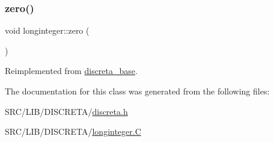 \subsubsection{\texorpdfstring{zero()}{zero()}}
{\footnotesize\ttfamily void longinteger\+::zero (\begin{DoxyParamCaption}{ }\end{DoxyParamCaption})\hspace{0.3cm}{\ttfamily [virtual]}}



Reimplemented from \mbox{\hyperlink{classdiscreta__base_a424aa44bbb6ca48d30ad1087dbd6f210}{discreta\+\_\+base}}.



The documentation for this class was generated from the following files\+:\begin{DoxyCompactItemize}
\item 
S\+R\+C/\+L\+I\+B/\+D\+I\+S\+C\+R\+E\+T\+A/\mbox{\hyperlink{discreta_8h}{discreta.\+h}}\item 
S\+R\+C/\+L\+I\+B/\+D\+I\+S\+C\+R\+E\+T\+A/\mbox{\hyperlink{longinteger_8_c}{longinteger.\+C}}\end{DoxyCompactItemize}
